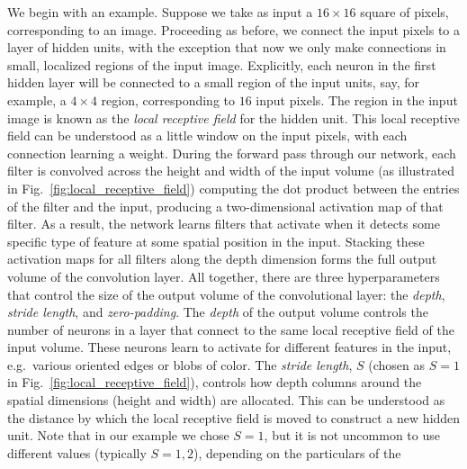 \documentclass[../main.tex]{subfiles}
\begin{document}
We begin with an example.
%
Suppose we take as input a $16\times16$ square of pixels, corresponding to an
image.
%
Proceeding as before, we connect the input pixels to a layer of hidden units,
with the exception that now we only make connections in small, localized
regions of the input image.
%
Explicitly, each neuron in the first hidden layer will be connected to a small
region of the input units, say, for example, a $4\times4$ region, corresponding
to $16$ input pixels.
%
The region in the input image is known as the \emph{local receptive field} for
the hidden unit.
%
This local receptive field can be understood as a little window on the input
pixels, with each connection learning a weight.
%
%
%
During the forward pass through our network, each filter is convolved across
the height and width of the input volume (as illustrated in
Fig.~\ref{fig:local_receptive_field}) computing the dot product between the
entries of the filter and the input, producing a two-dimensional activation map
of that filter.
%
As a result, the network learns filters that activate when it detects some
specific type of feature at some spatial position in the input.
%
Stacking these activation maps for all filters along the depth dimension forms
the full output volume of the convolution layer.
%
All together, there are three hyperparameters that control the size of the
output volume of the convolutional layer: the \emph{depth}, \emph{stride
length}, and \emph{zero-padding}.
%
The \emph{depth} of the output volume controls the number of neurons in a layer
that connect to the same local receptive field of the input volume.
%
These neurons learn to activate for different features in the input, e.g.\
various oriented edges or blobs of color.
%
The \emph{stride length}, $S$ (chosen as $S = 1$ in
Fig.~\ref{fig:local_receptive_field}), controls how depth columns around the
spatial dimensions (height and width) are allocated.
%
This can be understood as the distance by which the local receptive field is
moved to construct a new hidden unit.
%
Note that in our example we chose $S=1$, but it is not uncommon to use
different values (typically $S = 1, 2$), depending on the particulars of the
\end{document}
